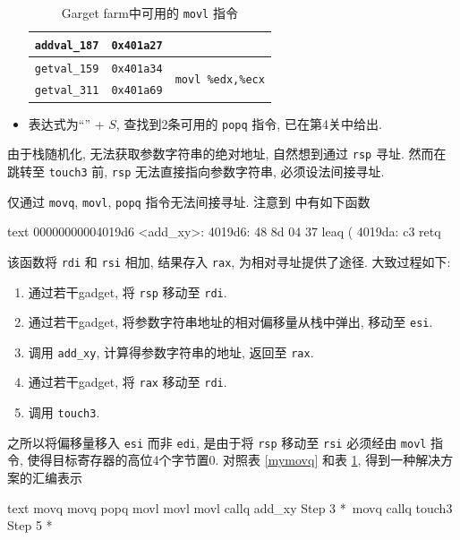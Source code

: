 \begin{itemize}[noitemsep]
\begin{table}[H]
\begin{tabular}{ccc}
            \verb|addval_187| & \verb|0x401a27| & \\
            \midrule
            \verb|getval_159| & \verb|0x401a34| & \multirow{2}{*}{ \texttt{movl \%edx,\%ecx}} \\
            \verb|getval_311| & \verb|0x401a69| & \\
            \bottomrule
        \end{tabular}
        \caption{Garget farm中可用的 \texttt{movl} 指令}\label{mymovl}
    \end{table}
    \item 表达式为``'' + $S$, 查找到2条可用的 \verb|popq| 指令, 已在第4关中给出.
\end{itemize}

由于栈随机化, 无法获取参数字符串的绝对地址, 自然想到通过 \verb|rsp| 寻址. 然而在跳转至 \verb|touch3| 前, \verb|rsp| 无法直接指向参数字符串, 必须设法间接寻址. 

仅通过 \verb|movq|, \verb|movl|, \verb|popq| 指令无法间接寻址. 注意到  中有如下函数
\begin{code}{text}
00000000004019d6 <add_xy>:
  4019d6: 48 8d 04 37                   leaq    (%
  4019da: c3                            retq
\end{code}
该函数将 \verb|rdi| 和 \verb|rsi| 相加, 结果存入 \verb|rax|, 为相对寻址提供了途径. 大致过程如下:
\begin{enumerate}[noitemsep]
    \item 通过若干gadget, 将 \verb|rsp| 移动至 \verb|rdi|.
    \item 通过若干gadget, 将参数字符串地址的相对偏移量从栈中弹出, 移动至 \verb|esi|.
    \item 调用 \verb|add_xy|, 计算得参数字符串的地址, 返回至 \verb|rax|.
    \item 通过若干gadget, 将 \verb|rax| 移动至 \verb|rdi|.
    \item 调用 \verb|touch3|.
\end{enumerate}

之所以将偏移量移入 \verb|esi| 而非 \verb|edi|, 是由于将 \verb|rsp| 移动至 \verb|rsi| 必须经由 \verb|movl| 指令, 使得目标寄存器的高位4个字节置0. 对照表 \ref{mymovq} 和表 \ref{mymovl}, 得到一种解决方案的汇编表示
\begin{code}{text}
movq    %
movq    %
popq    %
movl    %
movl    %
movl    %
callq   add_xy                  \* Step 3 *\
movq    %
callq   touch3                  \* Step 5 *\
\end{code}


